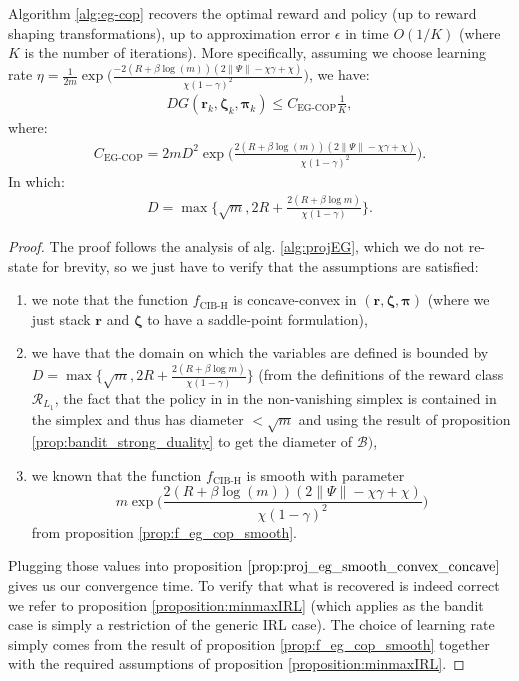   \begin{theorem}
    \label{thm:EG_COP_convergence}
    Algorithm \ref{alg:eg-cop} recovers the optimal reward and policy (up to reward shaping transformations), up to approximation error $\epsilon$ in time $O(1/K)$ (where $K$ is the number of iterations). More specifically, assuming we choose learning rate $\eta = \frac{1}{2m}  \exp \Big(\frac{-2\left(R + \beta \log{\left(m \right)}\right) \left(2  \|\Psi\| - \chi \gamma + \chi\right)}{\chi \left(1- \gamma\right)^{2}} \Big)$, we have: 
    \begin{align*}
        DG(\bm{r}_k,\bm{\zeta}_k,\bm{\pi}_k) 
        \leq C_\text{EG-COP} \frac{1}{K},
    \end{align*}
    where:
    \begin{align*}
        C_\text{EG-COP} = 2 m D^2  \exp \Bigg(\frac{2\left(R + \beta \log{\left(m \right)}\right) \left(2  \|\Psi\| - \chi \gamma + \chi\right)}{\chi \left(1- \gamma\right)^{2}} \Bigg).
    \end{align*}
    In which:
    \begin{align*}
        D = \max\Big\{
            \sqrt{m},
            2R 
            +\frac{2(R +\beta \log m)}{\chi (1-\gamma)} 
            \Big\}.
    \end{align*}
  \end{theorem}
\begin{proof}
    The proof follows the analysis of alg. \ref{alg:projEG}, which we do not re-state for brevity, so we just have to verify that the assumptions are satisfied:
    \begin{enumerate}
        \item we note that the function $f_\text{CIB-H}$ is concave-convex in $(\bm{r},\bm{\zeta},\bm{\pi})$ (where we just stack $\bm{r}$ and $\bm{\zeta}$ to have a saddle-point formulation),
        \item we have that the domain on which the variables are defined is bounded by $D= \max\Big\{\sqrt{m},2R +\frac{2(R +\beta \log m)}{\chi (1-\gamma)} \Big\} $ (from the definitions of the reward class $\mathcal{R}_{L_1}$, the fact that the policy in in the non-vanishing simplex is contained in the simplex and thus has diameter $<\sqrt{m}$ and using the result of proposition \ref{prop:bandit_strong_duality} to get the diameter of $\mathcal{B})$,
        \item we known that the function $f_\text{CIB-H}$ is smooth with parameter \[m  \exp \Big(\frac{2\left(R + \beta \log{\left(m \right)}\right) \left(2  \|\Psi\| - \chi \gamma + \chi\right)}{\chi \left(1- \gamma\right)^{2}} \Big)\] from proposition \ref{prop:f_eg_cop_smooth}.
    \end{enumerate}
    Plugging those values into proposition $\ref{prop:proj_eg_smooth_convex_concave}$ gives us our convergence time. To verify that what is recovered is indeed correct we refer to proposition \ref{proposition:minmaxIRL} (which applies as the bandit case is simply a restriction of the generic IRL case). The choice of learning rate simply comes from the result of proposition \ref{prop:f_eg_cop_smooth} together with the required assumptions of proposition \ref{proposition:minmaxIRL}.
\end{proof}
